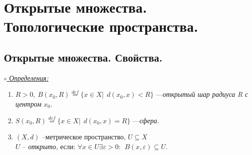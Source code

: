 \documentclass[10pt]{report}
\begin{document}
\section{Открытые множества. Топологические пространства.}
\subsection{Открытые множества. Свойства.}
\underline{\textit{$\circ$ Определения:}}\\
\begin{enumerate}
\item $R>0,~B(x_{0}, R)\overset{def}{=}\lbrace x\in X|~~d(x_{0},x)<R\rbrace$ ---\emph{открытый шар радиуса R с центром $x_{0}$}.
\item $S(x_{0}, R)\overset{def}{=}\lbrace x\in X|~~d(x_{0}, x)=R\rbrace$ ---\emph{сфера}.
\item $(X, d)$ --метрическое пространство, $U\subseteq X$
\\$U$ -- \emph{открыто}, если:
\subitem $\forall x\in U \exists \varepsilon >0 :~~B(x, \varepsilon)\subseteq U.$
\end{enumerate}
\end{document}

